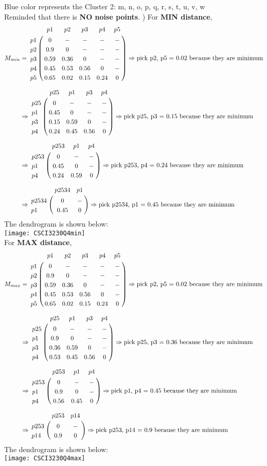 \documentclass[12pt]{article}
\begin{document}
Blue color represents the Cluster 2: m, n, o, p, q, r, s, t, u, v, w\\
Reminded that there is \textbf{NO noise points}.
) For \textbf{MIN distance},\\
\begin{align*}
M_{min} &= \bordermatrix{~ & p1 & p2 & p3 & p4 & p5 \cr
              p1 & 0 & - & - & - & - \cr
              p2 & 0.9 & 0 & - & - & - \cr
              p3 & 0.59 & 0.36 & 0 & - & - \cr
              p4 & 0.45 & 0.53 & 0.56 & 0 & - \cr
              p5 & 0.65 & 0.02 & 0.15 & 0.24 & 0 \cr} \Rightarrow \text{pick p2, p5 = 0.02 because they are minimum}\\[0.1in]
&\Rightarrow \bordermatrix{~ & p25 & p1 & p3 & p4 \cr
              p25 & 0 & - & - & - \cr
              p1 & 0.45 & 0 & - & - \cr
              p3 & 0.15 & 0.59 & 0 & - \cr
              p4 & 0.24 & 0.45 & 0.56 & 0 \cr} \Rightarrow \text{pick p25, p3 = 0.15 because they are minimum}\\[0.1in]
&\Rightarrow \bordermatrix{~ & p253 & p1 & p4 \cr
              p253 & 0 & - & - \cr
              p1 & 0.45 & 0 & - \cr
              p4 & 0.24 & 0.59 & 0 \cr} \Rightarrow \text{pick p253, p4 = 0.24 because they are minimum}\\[0.1in]
&\Rightarrow \bordermatrix{~ & p2534 & p1 \cr
              p2534 & 0 & - \cr
              p1 & 0.45 & 0 \cr} \Rightarrow \text{pick p2534, p1 = 0.45 because they are minimum}\\
\end{align*}
The dendrogram is shown below:\\
\texttt{[image: CSCI3230Q4min]}\\\newpage
For \textbf{MAX distance},\\
\begin{align*}
M_{max} &= \bordermatrix{~ & p1 & p2 & p3 & p4 & p5 \cr
              p1 & 0 & - & - & - & - \cr
              p2 & 0.9 & 0 & - & - & - \cr
              p3 & 0.59 & 0.36 & 0 & - & - \cr
              p4 & 0.45 & 0.53 & 0.56 & 0 & - \cr
              p5 & 0.65 & 0.02 & 0.15 & 0.24 & 0 \cr} \Rightarrow \text{pick p2, p5 = 0.02 because they are minimum}\\[0.1in]
&\Rightarrow \bordermatrix{~ & p25 & p1 & p3 & p4 \cr
              p25 & 0 & - & - & - \cr
              p1 & 0.9 & 0 & - & - \cr
              p3 & 0.36 & 0.59 & 0 & - \cr
              p4 & 0.53 & 0.45 & 0.56 & 0 \cr} \Rightarrow \text{pick p25, p3 = 0.36 because they are minimum}\\[0.1in]
&\Rightarrow \bordermatrix{~ & p253 & p1 & p4 \cr
              p253 & 0 & - & - \cr
              p1 & 0.9 & 0 & - \cr
              p4 & 0.56 & 0.45 & 0 \cr} \Rightarrow \text{pick p1, p4 = 0.45 because they are minimum}\\[0.1in]
&\Rightarrow \bordermatrix{~ & p253 & p14 \cr
              p253 & 0 & - \cr
              p14 & 0.9 & 0 \cr} \Rightarrow \text{pick p253, p14 = 0.9 because they are minimum}\\
\end{align*}
The dendrogram is shown below:\\
\texttt{[image: CSCI3230Q4max]}
\end{document}
